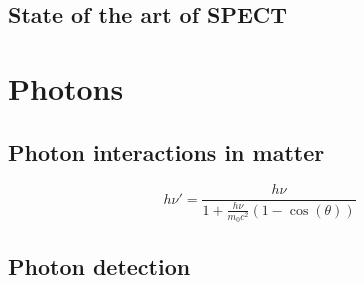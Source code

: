 \subsection{State of the art of SPECT}


\section{Photons}

\subsection{Photon interactions in matter}

\begin{equation}
h\nu' = \frac{h\nu}{1+\frac{h\nu}{m_{0}c^2}(1-\cos(\theta))}
\label{chap1::eq::Compton}
\end{equation} 

\subsection{Photon detection}


\clearpage
